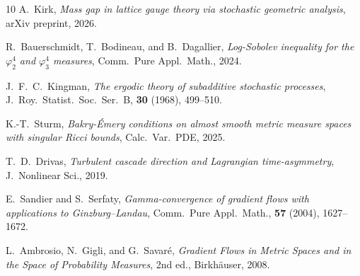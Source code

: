\documentclass[12pt,a4paper]{article}
\theoremstyle{definition}
\theoremstyle{remark}
\begin{document}
\begin{thebibliography}{10}
A.~Kirk, \textit{Mass gap in lattice gauge theory via stochastic geometric analysis}, arXiv preprint, 2026.

R.~Bauerschmidt, T.~Bodineau, and B.~Dagallier, \textit{Log-Sobolev inequality for the $\varphi^4_2$ and $\varphi^4_3$ measures}, Comm.~Pure Appl.~Math., 2024.

J.~F.~C.~Kingman, \textit{The ergodic theory of subadditive stochastic processes}, J.~Roy.\ Statist.\ Soc.\ Ser.~B, \textbf{30} (1968), 499--510.

K.-T.~Sturm, \textit{Bakry-\'Emery conditions on almost smooth metric measure spaces with singular Ricci bounds}, Calc.~Var.~PDE, 2025.

T.~D.~Drivas, \textit{Turbulent cascade direction and Lagrangian time-asymmetry}, J.~Nonlinear Sci., 2019.

E.~Sandier and S.~Serfaty, \textit{Gamma-convergence of gradient flows with applications to Ginzburg--Landau}, Comm.\ Pure Appl.\ Math., \textbf{57} (2004), 1627--1672.

L.~Ambrosio, N.~Gigli, and G.~Savar\'e, \textit{Gradient Flows in Metric Spaces and in the Space of Probability Measures}, 2nd ed., Birkh\"auser, 2008.

\end{thebibliography}
\end{document}
